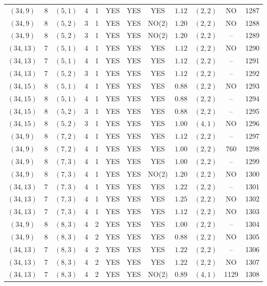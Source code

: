 \begin{longtable}{|c|c|c|c|c|c|c|c|c|c|c|c|}
$(34,9)$ & 8 & $(5,1)$ & 4 & 1 & YES & YES & YES & $1.12$ & $(2,2)$ & NO & 1287\\
$(34,9)$ & 8 & $(5,2)$ & 3 & 1 & YES & YES & NO(2) & $1.20$ & $(2,2)$ & NO & 1288\\
$(34,9)$ & 8 & $(5,2)$ & 3 & 1 & YES & YES & NO(2) & $1.20$ & $(2,2)$ & -- & 1289\\
$(34,13)$ & 7 & $(5,1)$ & 4 & 1 & YES & YES & YES & $1.12$ & $(2,2)$ & NO & 1290\\
$(34,13)$ & 7 & $(5,1)$ & 4 & 1 & YES & YES & YES & $1.12$ & $(2,2)$ & -- & 1291\\
$(34,13)$ & 7 & $(5,2)$ & 3 & 1 & YES & YES & YES & $1.12$ & $(2,2)$ & -- & 1292\\
$(34,15)$ & 8 & $(5,1)$ & 4 & 1 & YES & YES & YES & $0.88$ & $(2,2)$ & NO & 1293\\
$(34,15)$ & 8 & $(5,1)$ & 4 & 1 & YES & YES & YES & $0.88$ & $(2,2)$ & -- & 1294\\
$(34,15)$ & 8 & $(5,2)$ & 3 & 1 & YES & YES & YES & $0.88$ & $(2,2)$ & -- & 1295\\
$(34,15)$ & 8 & $(5,2)$ & 3 & 1 & YES & YES & YES & $1.00$ & $(4,1)$ & NO & 1296\\
$(34,9)$ & 8 & $(7,2)$ & 4 & 1 & YES & YES & YES & $1.12$ & $(2,2)$ & -- & 1297\\
$(34,9)$ & 8 & $(7,2)$ & 4 & 1 & YES & YES & YES & $1.00$ & $(2,2)$ & 760 & 1298\\
$(34,9)$ & 8 & $(7,3)$ & 4 & 1 & YES & YES & YES & $1.00$ & $(2,2)$ & -- & 1299\\
$(34,9)$ & 8 & $(7,3)$ & 4 & 1 & YES & YES & NO(2) & $1.20$ & $(2,2)$ & NO & 1300\\
$(34,13)$ & 7 & $(7,3)$ & 4 & 1 & YES & YES & YES & $1.22$ & $(2,2)$ & -- & 1301\\
$(34,13)$ & 7 & $(7,3)$ & 4 & 1 & YES & YES & YES & $1.25$ & $(2,2)$ & NO & 1302\\
$(34,13)$ & 7 & $(7,3)$ & 4 & 1 & YES & YES & YES & $1.12$ & $(2,2)$ & NO & 1303\\
$(34,9)$ & 8 & $(8,3)$ & 4 & 2 & YES & YES & YES & $1.00$ & $(2,2)$ & -- & 1304\\
$(34,9)$ & 8 & $(8,3)$ & 4 & 2 & YES & YES & YES & $0.88$ & $(2,2)$ & NO & 1305\\
$(34,13)$ & 7 & $(8,3)$ & 4 & 2 & YES & YES & YES & $1.22$ & $(2,2)$ & -- & 1306\\
$(34,13)$ & 7 & $(8,3)$ & 4 & 2 & YES & YES & YES & $1.22$ & $(2,2)$ & NO & 1307\\
$(34,13)$ & 7 & $(8,3)$ & 4 & 2 & YES & YES & NO(2) & $0.89$ & $(4,1)$ & 1129 & 1308\\

\end{longtable}
